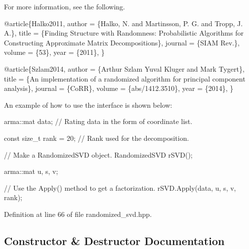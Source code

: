 For more information, see the following.


\begin{DoxyCode}
@article\{Halko2011,
  author  = \{Halko, N. and Martinsson, P. G. and Tropp, J. A.\},
  title   = \{Finding Structure with Randomness: Probabilistic Algorithms \textcolor{keywordflow}{for}
             Constructing Approximate Matrix Decompositions\},
  journal = \{SIAM Rev.\},
  volume  = \{53\},
  year    = \{2011\},
\}
\end{DoxyCode}



\begin{DoxyCode}
@article\{Szlam2014,
  author  = \{Arthur Szlam Yuval Kluger and Mark Tygert\},
  title   = \{An implementation of a randomized algorithm \textcolor{keywordflow}{for} principal
             component analysis\},
  journal = \{CoRR\},
  volume  = \{abs/1412.3510\},
  year    = \{2014\},
\}
\end{DoxyCode}


An example of how to use the interface is shown below\+:


\begin{DoxyCode}
arma::mat data; \textcolor{comment}{// Rating data in the form of coordinate list.}

\textcolor{keyword}{const} \textcolor{keywordtype}{size\_t} rank = 20; \textcolor{comment}{// Rank used for the decomposition.}

\textcolor{comment}{// Make a RandomizedSVD object.}
RandomizedSVD rSVD();

arma::mat u, s, v;

\textcolor{comment}{// Use the Apply() method to get a factorization.}
rSVD.Apply(data, u, s, v, rank);
\end{DoxyCode}
 

Definition at line 66 of file randomized\+\_\+svd.\+hpp.



\subsection{Constructor \& Destructor Documentation}
\mbox{\label{classmlpack_1_1svd_1_1RandomizedSVD_af70e8f0a731005cb119a615c99057f66}} 
